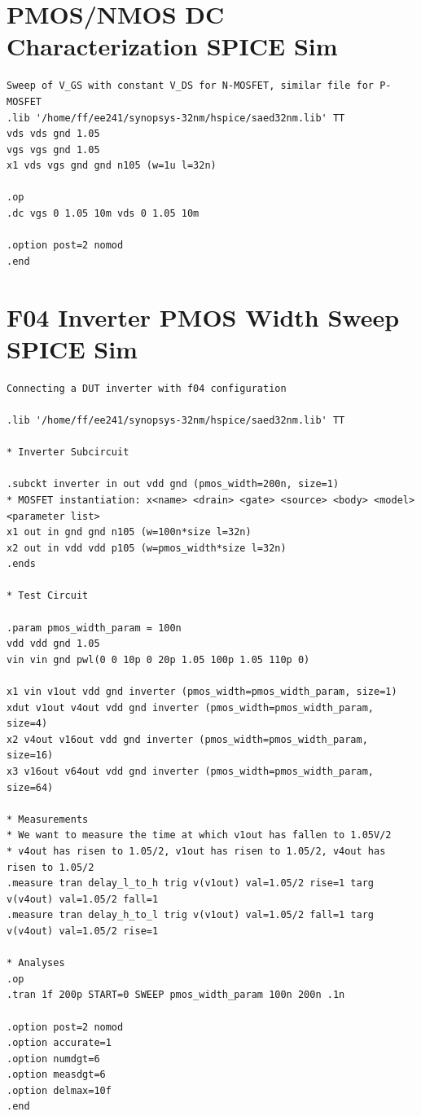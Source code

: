 \documentclass[11pt]{article}
\begin{document}
\newpage
\appendix
\section{PMOS/NMOS DC Characterization SPICE Sim} \label{dc_characterization_spice}
\begin{verbatim}
Sweep of V_GS with constant V_DS for N-MOSFET, similar file for P-MOSFET
.lib '/home/ff/ee241/synopsys-32nm/hspice/saed32nm.lib' TT
vds vds gnd 1.05
vgs vgs gnd 1.05 
x1 vds vgs gnd gnd n105 (w=1u l=32n)

.op
.dc vgs 0 1.05 10m vds 0 1.05 10m

.option post=2 nomod
.end
\end{verbatim}

\section{F04 Inverter PMOS Width Sweep SPICE Sim}
\begin{verbatim}
Connecting a DUT inverter with f04 configuration

.lib '/home/ff/ee241/synopsys-32nm/hspice/saed32nm.lib' TT

* Inverter Subcircuit

.subckt inverter in out vdd gnd (pmos_width=200n, size=1)
* MOSFET instantiation: x<name> <drain> <gate> <source> <body> <model> <parameter list>
x1 out in gnd gnd n105 (w=100n*size l=32n)
x2 out in vdd vdd p105 (w=pmos_width*size l=32n)
.ends

* Test Circuit

.param pmos_width_param = 100n
vdd vdd gnd 1.05
vin vin gnd pwl(0 0 10p 0 20p 1.05 100p 1.05 110p 0)

x1 vin v1out vdd gnd inverter (pmos_width=pmos_width_param, size=1)
xdut v1out v4out vdd gnd inverter (pmos_width=pmos_width_param, size=4)
x2 v4out v16out vdd gnd inverter (pmos_width=pmos_width_param, size=16)
x3 v16out v64out vdd gnd inverter (pmos_width=pmos_width_param, size=64)

* Measurements
* We want to measure the time at which v1out has fallen to 1.05V/2
* v4out has risen to 1.05/2, v1out has risen to 1.05/2, v4out has risen to 1.05/2
.measure tran delay_l_to_h trig v(v1out) val=1.05/2 rise=1 targ v(v4out) val=1.05/2 fall=1
.measure tran delay_h_to_l trig v(v1out) val=1.05/2 fall=1 targ v(v4out) val=1.05/2 rise=1

* Analyses
.op
.tran 1f 200p START=0 SWEEP pmos_width_param 100n 200n .1n

.option post=2 nomod
.option accurate=1
.option numdgt=6
.option measdgt=6
.option delmax=10f
.end
\end{verbatim}
\end{document}
